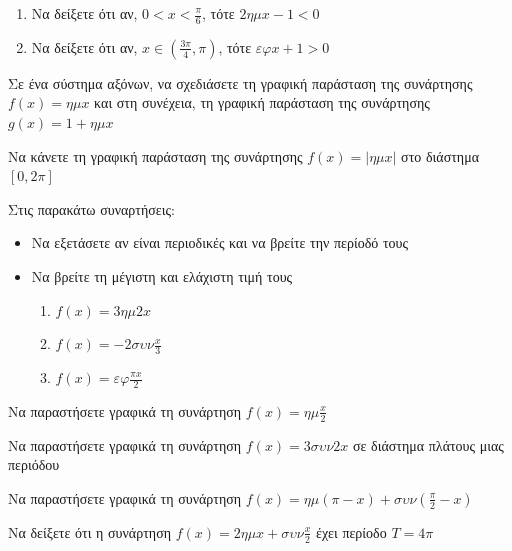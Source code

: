 \documentclass{presentation}
\begin{document}
\begin{askisi}
  \begin{enumerate}
    \item<1-> Να δείξετε ότι αν, $0<x<\frac{π}{6}$, τότε $2ημx-1<0$
    \item<2-> Να δείξετε ότι αν, $x\in(\frac{3π}{4},π)$, τότε $εφx+1>0$
  \end{enumerate}
\end{askisi}

\begin{askisi}
  Σε ένα σύστημα αξόνων, να σχεδιάσετε τη γραφική παράσταση της συνάρτησης $f(x)=ημx$ και στη συνέχεια, τη γραφική παράσταση της συνάρτησης $g(x)=1+ημx$
\end{askisi}

\begin{askisi}
  Να κάνετε τη γραφική παράσταση της συνάρτησης $f(x)=|ημx|$ στο διάστημα $[0,2π]$
\end{askisi}

\begin{askisi}
  Στις παρακάτω συναρτήσεις:
  \begin{itemize}
    \item Να εξετάσετε αν είναι περιοδικές και να βρείτε την περίοδό τους
    \item Να βρείτε τη μέγιστη και ελάχιστη τιμή τους
          \begin{enumerate}
            \item<1-> $f(x)=3ημ2x$
            \item<2-> $f(x)=-2συν\frac{x}{3}$
            \item<3-> $f(x)=εφ\frac{πx}{2}$
          \end{enumerate}
  \end{itemize}
\end{askisi}

\begin{askisi}
  Να παραστήσετε γραφικά τη συνάρτηση $f(x)=ημ\frac{x}{2}$
\end{askisi}

\begin{askisi}
  Να παραστήσετε γραφικά τη συνάρτηση $f(x)=3συν2x$ σε διάστημα πλάτους μιας περιόδου
\end{askisi}

\begin{askisi}
  Να παραστήσετε γραφικά τη συνάρτηση $f(x)=ημ(π-x)+συν(\frac{π}{2}-x)$
\end{askisi}

\begin{askisi}
  Να δείξετε ότι η συνάρτηση $f(x)=2ημx+συν\frac{x}{2}$ έχει περίοδο $T=4π$
\end{askisi}
\end{document}
